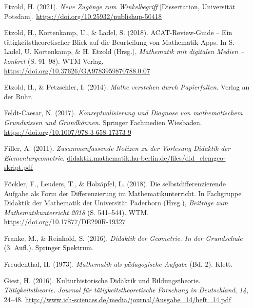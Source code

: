 \documentclass[
]{scrbook}
\newlength{\cslhangindent}
\newlength{\cslentryspacingunit} %
\newenvironment{CSLReferences}[2] %
 {%
  \setlength{\parindent}{0pt}
  \ifodd #1
  \let\oldpar\par
  \def\par{\hangindent=\cslhangindent\oldpar}
  \fi
  \setlength{\parskip}{#2\cslentryspacingunit}
 }%
 {}
\theoremstyle{definition}
\theoremstyle{definition}
\theoremstyle{definition}
\theoremstyle{definition}
\theoremstyle{remark}
\begin{document}
\begin{CSLReferences}{1}{0}
\leavevmode{}%
Etzold, H. (2021). \emph{Neue Zugänge zum Winkelbegriff} {[}Dissertation, Universität Potsdam{]}. \url{https://doi.org/10.25932/publishup-50418}

\leavevmode{}%
Etzold, H., Kortenkamp, U., \& Ladel, S. (2018). {ACAT}-{Review}-{Guide} -- {Ein} tätigkeitstheoretischer {Blick} auf die {Beurteilung} von {Mathematik}-{Apps}. In S. Ladel, U. Kortenkamp, \& H. Etzold (Hrsg.), \emph{Mathematik mit digitalen {Medien} -- konkret} (S. 91--98). WTM-Verlag. \url{https://doi.org/10.37626/GA9783959870788.0.07}

\leavevmode{}%
Etzold, H., \& Petzschler, I. (2014). \emph{Mathe verstehen durch {Papierfalten}}. Verlag an der Ruhr.

\leavevmode{}%
Feldt-Caesar, N. (2017). \emph{Konzeptualisierung und {Diagnose} von mathematischem {Grundwissen} und {Grundkönnen}}. Springer Fachmedien Wiesbaden. \url{https://doi.org/10.1007/978-3-658-17373-9}

\leavevmode{}%
Filler, A. (2011). \emph{Zusammenfassende {Notizen} zu der {Vorlesung} {Didaktik} der {Elementargeometrie}}. \href{https://didaktik.mathematik.hu-berlin.de/files/did_elemgeo-skript.pdf}{didaktik.mathematik.hu-berlin.de/files/did\_elemgeo-skript.pdf}

\leavevmode{}%
Föckler, F., Leuders, T., \& Holzäpfel, L. (2018). Die selbstdifferenzierende {Aufgabe} als {Form} der {Differenzierung} im {Mathematikunterricht}. In Fachgruppe Didaktik der Mathematik der Universität Paderborn (Hrsg.), \emph{Beiträge zum {Mathematikunterricht} 2018} (S. 541--544). WTM. \url{https://doi.org/10.17877/DE290R-19327}

\leavevmode{}%
Franke, M., \& Reinhold, S. (2016). \emph{Didaktik der {Geometrie}. {In} der {Grundschule}} (3. Aufl.). Springer Spektrum.

\leavevmode{}%
Freudenthal, H. (1973). \emph{Mathematik als pädagogische {Aufgabe}} (Bd. 2). Klett.

\leavevmode{}%
Giest, H. (2016). Kulturhistorische {Didaktik} und {Bildungstheorie}. \emph{Tätigkeitstheorie. Journal für tätigkeitstheoretische Forschung in Deutschland}, \emph{14}, 24--48. \url{http://www.ich-sciences.de/media/journal/Ausgabe_14/heft_14.pdf}


\end{CSLReferences}
\end{document}
